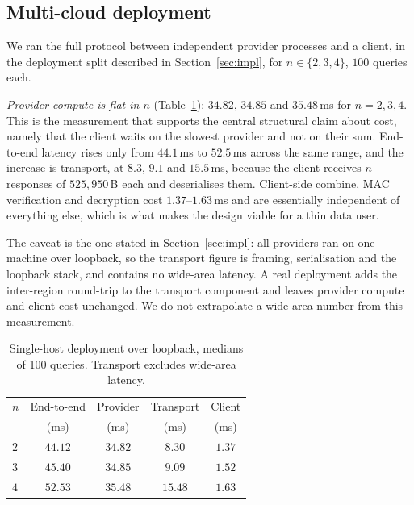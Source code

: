 \documentclass[a4paper,fleqn]{cas-dc}
\begin{document}
\subsection{Multi-cloud deployment}
\label{sec:wanresult}
We ran the full protocol between independent provider processes and a client,
in the deployment split described in Section~\ref{sec:impl}, for
$n\in\{2,3,4\}$, $100$ queries each.

\emph{Provider compute is flat in $n$} (Table~\ref{tab:wan}): $34.82$, $34.85$
and $35.48$\,ms for $n=2,3,4$. This is the measurement that supports the
central structural claim about cost, namely that the client waits on the
slowest provider and not on their sum. End-to-end latency rises only from
$44.1$\,ms to $52.5$\,ms across the same range, and the increase is transport,
at $8.3$, $9.1$ and $15.5$\,ms, because the client receives $n$ responses of
$525{,}950$\,B each and deserialises them. Client-side combine, MAC
verification and decryption cost $1.37$--$1.63$\,ms and are essentially
independent of everything else, which is what makes the design viable for a
thin data user.

The caveat is the one stated in Section~\ref{sec:impl}: all providers ran on
one machine over loopback, so the transport figure is framing, serialisation
and the loopback stack, and contains no wide-area latency. A real deployment
adds the inter-region round-trip to the transport component and leaves
provider compute and client cost unchanged. We do not extrapolate a wide-area
number from this measurement.

\begin{table}[pos=t]
\caption{Single-host deployment over loopback, medians of 100 queries.
Transport excludes wide-area latency.}
\label{tab:wan}
\centering
\footnotesize
\setlength{\tabcolsep}{3pt}
\renewcommand{\arraystretch}{1.2}
\begin{tabular*}{\tblwidth}{@{\extracolsep{\fill}}lcccc@{}}
\toprule
$n$ & End-to-end & Provider & Transport & Client \\
    & (ms)       & (ms)     & (ms)      & (ms) \\
\midrule
$2$ & $44.12$ & $34.82$ & $8.30$  & $1.37$ \\
$3$ & $45.40$ & $34.85$ & $9.09$  & $1.52$ \\
$4$ & $52.53$ & $35.48$ & $15.48$ & $1.63$ \\
\bottomrule
\end{tabular*}
\end{table}
\end{document}
